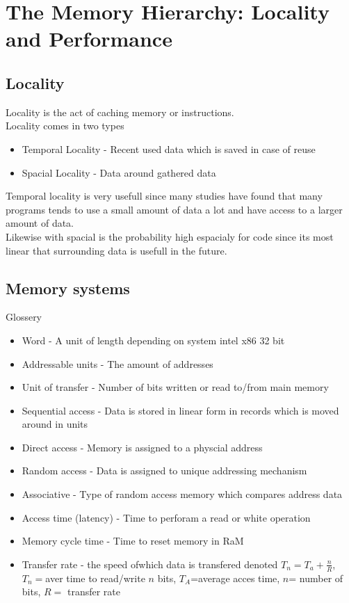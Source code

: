 \documentclass[12pt, a4paper]{article}
\begin{document}
	\section{The Memory Hierarchy: Locality and Performance}
		\subsection{Locality}
			Locality is the act of caching memory or instructions.\\
			Locality comes in two types
			\begin{itemize}
				\item Temporal Locality  - Recent used data which is saved in case of reuse
				\item Spacial Locality - Data around gathered data
			\end{itemize}
			Temporal locality is very usefull since many studies have found that many programs tends to use a small amount of data a lot and have access to a larger amount of data.\\
			Likewise with spacial is the probability high espacialy for code since its most linear that surrounding data is usefull in the future.
		\subsection{Memory systems}
			Glossery
			\begin{itemize}
				\item Word - A unit of length depending on system intel x86 32 bit
				\item Addressable units - The amount of addresses
				\item Unit of transfer - Number of bits written or read to/from main memory
				\item Sequential access - Data is stored in linear form in records which is moved around in units
				\item Direct access - Memory is assigned to a physcial address
				\item Random access -  Data is assigned to unique addressing mechanism
				\item Associative - Type of random access memory which compares address data
				\item Access time (latency) - Time to perforam a read or white operation
				\item Memory cycle time - Time to reset memory in RaM
				\item Transfer rate - the speed ofwhich data is transfered denoted $T_n=T_a+\frac{n}{R}$, $T_n=$aver time to read/write $n$ bits, $T_A$=average acces time, $n$= number of bits, $R=$ transfer rate
			\end{itemize}
\end{document}
